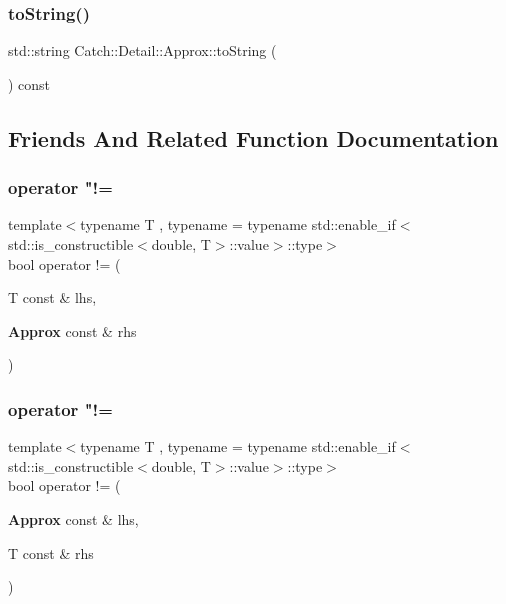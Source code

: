 \subsubsection{toString()}
{\footnotesize\ttfamily std\+::string Catch\+::\+Detail\+::\+Approx\+::to\+String (\begin{DoxyParamCaption}{ }\end{DoxyParamCaption}) const}



\subsection{Friends And Related Function Documentation}
\mbox{\label{class_catch_1_1_detail_1_1_approx_ad878de1a82eb134e32d3434bb3fddd54}} 
\subsubsection{operator "!=\hspace{0.1cm}{\footnotesize\ttfamily [1/2]}}
{\footnotesize\ttfamily template$<$typename T , typename  = typename std\+::enable\+\_\+if$<$std\+::is\+\_\+constructible$<$double, T$>$\+::value$>$\+::type$>$ \\
bool operator != (\begin{DoxyParamCaption}\item[{T const \&}]{lhs,  }\item[{\textbf{ Approx} const \&}]{rhs }\end{DoxyParamCaption})\hspace{0.3cm}{\ttfamily [friend]}}

\mbox{\label{class_catch_1_1_detail_1_1_approx_a0902653024d8e11e76632b2faa1f6bd5}} 
\subsubsection{operator "!=\hspace{0.1cm}{\footnotesize\ttfamily [2/2]}}
{\footnotesize\ttfamily template$<$typename T , typename  = typename std\+::enable\+\_\+if$<$std\+::is\+\_\+constructible$<$double, T$>$\+::value$>$\+::type$>$ \\
bool operator != (\begin{DoxyParamCaption}\item[{\textbf{ Approx} const \&}]{lhs,  }\item[{T const \&}]{rhs }\end{DoxyParamCaption})\hspace{0.3cm}{\ttfamily [friend]}}

